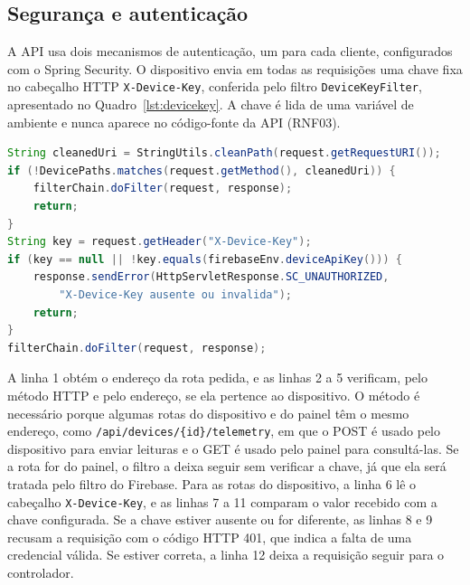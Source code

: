 \subsection{Segurança e autenticação}
\label{subsec:seguranca}

A API usa dois mecanismos de autenticação, um para cada cliente, configurados com o Spring Security. O dispositivo envia em todas as requisições uma chave fixa no cabeçalho HTTP \texttt{X-Device-Key}, conferida pelo filtro \texttt{DeviceKeyFilter}, apresentado no Quadro~\ref{lst:devicekey}. A chave é lida de uma variável de ambiente e nunca aparece no código-fonte da API (RNF03).

\vspace{0.6\baselineskip}
\noindent\begin{minipage}{\linewidth}
\begin{lstlisting}[language=Java, caption={Verificação da chave do dispositivo (trecho de DeviceKeyFilter)}, label={lst:devicekey}]
String cleanedUri = StringUtils.cleanPath(request.getRequestURI());
if (!DevicePaths.matches(request.getMethod(), cleanedUri)) {
    filterChain.doFilter(request, response);
    return;
}
String key = request.getHeader("X-Device-Key");
if (key == null || !key.equals(firebaseEnv.deviceApiKey())) {
    response.sendError(HttpServletResponse.SC_UNAUTHORIZED,
        "X-Device-Key ausente ou invalida");
    return;
}
filterChain.doFilter(request, response);
\end{lstlisting}
\vspace{-0.5\baselineskip}
\end{minipage}
\medskip

A linha 1 obtém o endereço da rota pedida, e as linhas 2 a 5 verificam, pelo método HTTP e pelo endereço, se ela pertence ao dispositivo. O método é necessário porque algumas rotas do dispositivo e do painel têm o mesmo endereço, como \texttt{/api/devices/\{id\}/telemetry}, em que o POST é usado pelo dispositivo para enviar leituras e o GET é usado pelo painel para consultá-las. Se a rota for do painel, o filtro a deixa seguir sem verificar a chave, já que ela será tratada pelo filtro do Firebase. Para as rotas do dispositivo, a linha 6 lê o cabeçalho \texttt{X-Device-Key}, e as linhas 7 a 11 comparam o valor recebido com a chave configurada. Se a chave estiver ausente ou for diferente, as linhas 8 e 9 recusam a requisição com o código HTTP 401, que indica a falta de uma credencial válida. Se estiver correta, a linha 12 deixa a requisição seguir para o controlador.

